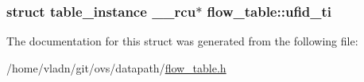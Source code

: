 \subsubsection[{ufid\+\_\+ti}]{\setlength{\rightskip}{0pt plus 5cm}struct {\bf table\+\_\+instance} {\bf \+\_\+\+\_\+rcu}$\ast$ flow\+\_\+table\+::ufid\+\_\+ti}\label{structflow__table_aa29e185501af8dcd15549ee157c6c047}


The documentation for this struct was generated from the following file\+:\begin{DoxyCompactItemize}
\item 
/home/vladn/git/ovs/datapath/\hyperlink{flow__table_8h}{flow\+\_\+table.\+h}\end{DoxyCompactItemize}
